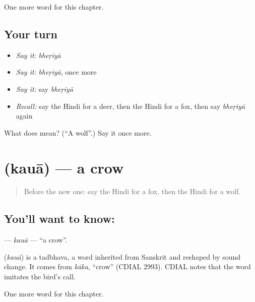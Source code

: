 \begin{grammarlens}[title={What you've built}]
One more word for this chapter.
\end{grammarlens}

\subsection*{Your turn}
\begin{itemize}
\raggedright
  \item \emph{Say it:} \emph{bheṛiyā}
  \item \emph{Say it:} \emph{bheṛiyā}, once more
  \item \emph{Say it:} say \emph{bheṛiyā}
  \item \emph{Recall:} say the Hindi for a deer, then the Hindi for a fox, then say \emph{bheṛiyā} again
\end{itemize}

\begin{tcolorbox}[breakable,colback=teal!4,colframe=teal!35!black,title={Before you move on}]
What does  mean? (\textquotedblleft{}A wolf\textquotedblright{}.) Say it once more.
\end{tcolorbox}
\section[\texorpdfstring{\hi{कौआ} (kauā)}{कौआ (kauā)}]{ (kauā) — a crow}

\label{lesson:HI-C147-kaua}



\begin{quote}
Before the new one: say the Hindi for a fox, then the Hindi for a wolf.
\end{quote}

\subsection*{You'll want to know: }
\textbf{} — \emph{kauā} — \textquotedblleft{}a crow\textquotedblright{}.

\begin{cousinweb}
\textbf{} (\emph{kauā}) is a tadbhava, a word inherited from Sanskrit and reshaped by sound change. It comes from \emph{kāka}, \textquotedblleft{}crow\textquotedblright{} (CDIAL 2993). CDIAL notes that the word imitates the bird's call.
\end{cousinweb}

\begin{grammarlens}[title={What you've built}]
One more word for this chapter.
\end{grammarlens}

